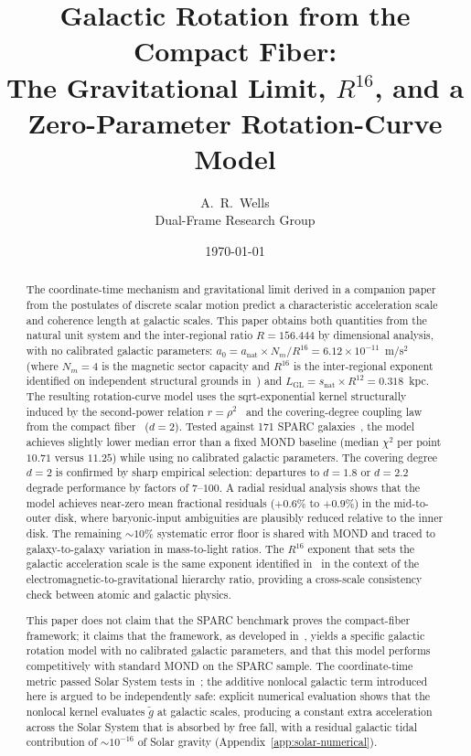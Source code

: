 \documentclass[11pt,a4paper]{article}
\title{Galactic Rotation from the Compact Fiber:\\
The Gravitational Limit, $R^{16}$, and a Zero-Parameter Rotation-Curve Model}
\author{A.\ R.\ Wells\\
Dual-Frame Research Group}
\date{\today}
\begin{document}
\maketitle

\begin{abstract}
The coordinate-time mechanism and gravitational limit derived in a companion paper~\cite{Wells2026c} from the postulates of discrete scalar motion predict a characteristic acceleration scale and coherence length at galactic scales.
This paper obtains both quantities from the natural unit system and the inter-regional ratio $R = 156.444$ by dimensional analysis, with no calibrated galactic parameters: $a_0 = a_{\mathrm{nat}} \times N_m / R^{16} = 6.12 \times 10^{-11}$~m/s$^2$ (where $N_m = 4$ is the magnetic sector capacity and $R^{16}$ is the inter-regional exponent identified on independent structural grounds in~\cite{Wells2026c}) and $L_{\mathrm{GL}} = s_{\mathrm{nat}} \times R^{12} = 0.318$~kpc.
The resulting rotation-curve model uses the sqrt-exponential kernel structurally induced by the second-power relation $r = \rho^2$~\cite{Wells2026b} and the covering-degree coupling law from the compact fiber~\cite{Wells2026a} ($d = 2$).
Tested against 171 SPARC galaxies~\cite{Lelli2016}, the model achieves slightly lower median error than a fixed MOND baseline (median $\chi^2$ per point $10.71$ versus $11.25$) while using no calibrated galactic parameters.
The covering degree $d = 2$ is confirmed by sharp empirical selection: departures to $d = 1.8$ or $d = 2.2$ degrade performance by factors of $7$--$100$.
A radial residual analysis shows that the model achieves near-zero mean fractional residuals ($+0.6\%$ to $+0.9\%$) in the mid-to-outer disk, where baryonic-input ambiguities are plausibly reduced relative to the inner disk.
The remaining ${\sim}10\%$ systematic error floor is shared with MOND and traced to galaxy-to-galaxy variation in mass-to-light ratios.
The $R^{16}$ exponent that sets the galactic acceleration scale is the same exponent identified in~\cite{Wells2026c} in the context of the electromagnetic-to-gravitational hierarchy ratio, providing a cross-scale consistency check between atomic and galactic physics.

This paper does not claim that the SPARC benchmark proves the compact-fiber framework; it claims that the framework, as developed in~\cite{Wells2026a,Wells2026b,Wells2026c}, yields a specific galactic rotation model with no calibrated galactic parameters, and that this model performs competitively with standard MOND on the SPARC sample.
The coordinate-time metric passed Solar System tests in~\cite{Wells2026c}; the additive nonlocal galactic term introduced here is argued to be independently safe: explicit numerical evaluation shows that the nonlocal kernel evaluates $\tilde{g}$ at galactic scales, producing a constant extra acceleration across the Solar System that is absorbed by free fall, with a residual galactic tidal contribution of ${\sim}10^{-16}$ of Solar gravity (Appendix~\ref{app:solar-numerical}).
\end{abstract}
\end{document}
